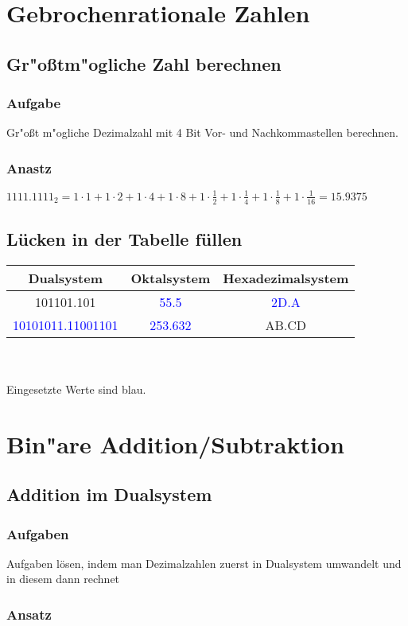 \documentclass[a4paper,11pt,titlepage]{article}
\begin{document}
\section{Gebrochenrationale Zahlen}
\subsection{Gr"oßtm"ogliche Zahl berechnen}
\subsubsection{Aufgabe}
Gr"oßt m"ogliche Dezimalzahl mit 4 Bit Vor- und Nachkommastellen berechnen.
\subsubsection{Anastz}
$1111.1111_2 =  1\cdot 1 + 1\cdot 2 + 1\cdot 4 +1\cdot 8 + 1\cdot\frac{1}{2} + 
1\cdot\frac{1}{4} + 1\cdot\frac{1}{8}+1\cdot\frac{1}{16} = 15.9375$
\subsection{Lücken in der Tabelle füllen}
\begin{tabular}{|c|c|c|}
\hline
Dualsystem&Oktalsystem&Hexadezimalsystem\\
\hline
101101.101&\textcolor{blue}{55.5}&\textcolor{blue}{2D.A}\\
\hline
\textcolor{blue}{10101011.11001101}&\textcolor{blue}{253.632}&AB.CD\\
\hline
\end{tabular}\\
\\
Eingesetzte Werte sind blau.
\section{Bin"are Addition/Subtraktion}
\subsection{Addition im Dualsystem}
\subsubsection{Aufgaben}
Aufgaben lösen, indem man Dezimalzahlen zuerst in Dualsystem umwandelt und in diesem dann rechnet
\subsubsection{Ansatz}
\end{document}
